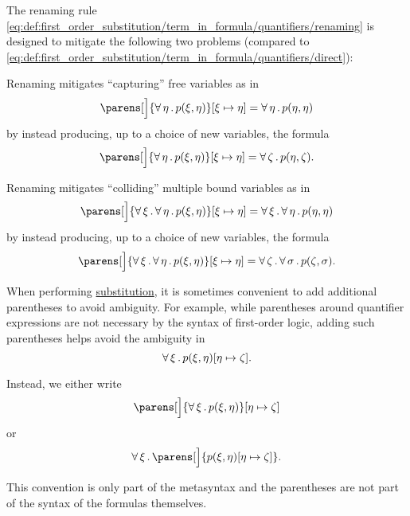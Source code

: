 \begin{remark}\label{rem:first_order_substitution_renaming_justification}
  The renaming rule \eqref{eq:def:first_order_substitution/term_in_formula/quantifiers/renaming} is designed to mitigate the following two problems (compared to \eqref{eq:def:first_order_substitution/term_in_formula/quantifiers/direct}):

  \begin{thmenum}
     Renaming mitigates \enquote{capturing} free variables as in
    \begin{equation*}
      \parens[\Big]{ \qforall \eta p(\xi, \eta) }[\xi \mapsto \eta] = \qforall \eta p(\eta, \eta)
    \end{equation*}
    by instead producing, up to a choice of new variables, the formula
    \begin{equation*}
      \parens[\Big]{ \qforall \eta p(\xi, \eta) }[\xi \mapsto \eta] = \qforall \zeta p(\eta, \zeta).
    \end{equation*}

     Renaming mitigates \enquote{colliding} multiple bound variables as in
    \begin{equation*}
      \parens[\Big]{ \qforall \xi \qforall \eta p(\xi, \eta) }[\xi \mapsto \eta] = \qforall \xi \qforall \eta p(\eta, \eta)
    \end{equation*}
    by instead producing, up to a choice of new variables, the formula
    \begin{equation*}
      \parens[\Big]{ \qforall \xi \qforall \eta p(\xi, \eta) }[\xi \mapsto \eta] = \qforall \zeta \qforall \sigma p(\zeta, \sigma).
    \end{equation*}
  \end{thmenum}
\end{remark}

\begin{remark}\label{rem:first_order_substitution_parentheses}
  When performing \hyperref[def:propositional_substitution]{substitution}, it is sometimes convenient to add additional parentheses to avoid ambiguity. For example, while parentheses around quantifier expressions are not necessary by the syntax of first-order logic, adding such parentheses helps avoid the ambiguity in
  \begin{equation*}
    \forall \thinspace \xi \thinspace . \thinspace p(\xi, \eta) [\eta \mapsto \zeta].
  \end{equation*}

  Instead, we either write
  \begin{equation*}
    \parens[\Big]{ \qforall \xi p(\xi, \eta) } [\eta \mapsto \zeta]
  \end{equation*}
  or
  \begin{equation*}
    \qforall \xi \parens[\Big]{ p(\xi, \eta)[\eta \mapsto \zeta] }.
  \end{equation*}

  This convention is only part of the metasyntax and the parentheses are not part of the syntax of the formulas themselves.
\end{remark}

